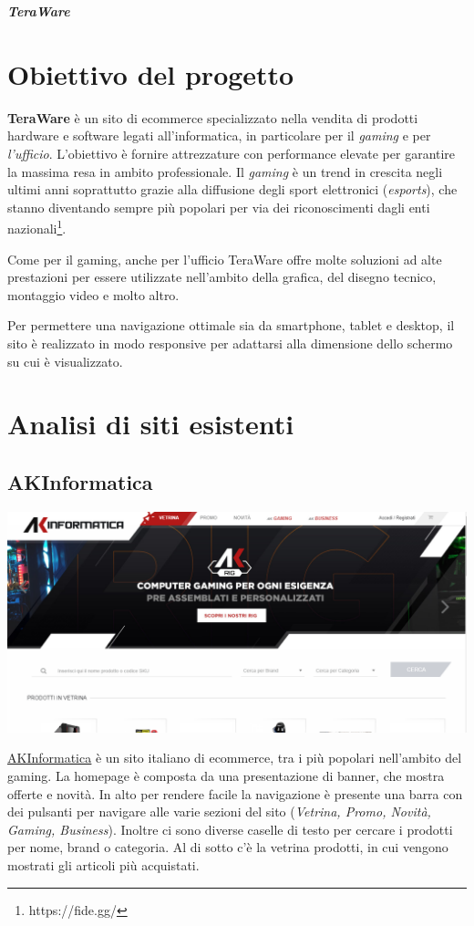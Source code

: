 \documentclass{article}
\begin{document}
\begin{large}
\tableofcontents
\newpage 
\begin{center}
    \fontsize{36}{0} \textit{\textbf{TeraWare}}
\end{center}
\section{Obiettivo del progetto}
\textbf{TeraWare} è un sito di ecommerce specializzato nella vendita di prodotti hardware e software legati all'informatica, in particolare per il \textit{gaming} e per \textit{l'ufficio}. L'obiettivo è fornire attrezzature con performance elevate per garantire la massima resa in ambito professionale. Il \textit{gaming} è un trend in crescita negli ultimi anni soprattutto grazie alla diffusione degli sport elettronici (\textit{esports}), che stanno diventando sempre più popolari per via dei riconoscimenti dagli enti nazionali\footnote{https://fide.gg/}.


Come per il gaming, anche per l'ufficio TeraWare offre molte soluzioni ad alte prestazioni per essere utilizzate nell'ambito della grafica, del disegno tecnico, montaggio video e molto altro.


Per permettere una navigazione ottimale sia da smartphone, tablet e desktop, il sito è realizzato in modo responsive per adattarsi alla dimensione dello schermo su cui è visualizzato. 
\section{Analisi di siti esistenti}
\subsection{AKInformatica}

\begin{center}
\includegraphics[scale=0.45]{akinformatica/ak1.png}
\end{center}
\href{https://shop.akinformatica.it/}{\underline{AKInformatica}} è un sito italiano di ecommerce, tra i più popolari nell'ambito del gaming. La homepage è composta da una presentazione di banner, che mostra offerte e novità. In alto per rendere facile la navigazione è presente una barra con dei pulsanti per navigare alle varie sezioni del sito (\textit{Vetrina, Promo, Novità, Gaming, Business}). Inoltre ci sono diverse caselle di testo per cercare i prodotti per nome, brand o categoria. Al di sotto c'è la vetrina prodotti, in cui vengono mostrati gli articoli più acquistati.



\end{large}
\end{document}
